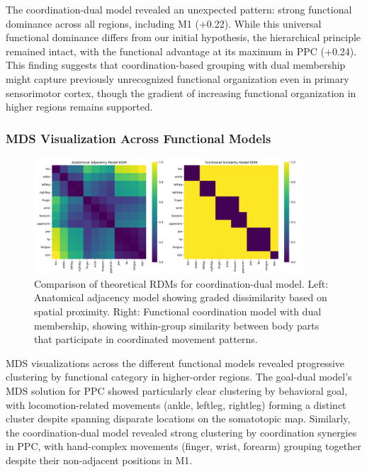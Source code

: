 \documentclass{article}
\begin{document}
The coordination-dual model revealed an unexpected pattern: strong functional dominance across all regions, including M1 (+0.22). While this universal functional dominance differs from our initial hypothesis, the hierarchical principle remained intact, with the functional advantage at its maximum in PPC (+0.24). This finding suggests that coordination-based grouping with dual membership might capture previously unrecognized functional organization even in primary sensorimotor cortex, though the gradient of increasing functional organization in higher regions remains supported.

\subsubsection{MDS Visualization Across Functional Models}

\begin{figure}[!htbp]
\centering
\includegraphics[width=0.9\textwidth]{results/coordination_dual/theoretical_rdms.png}
\caption{Comparison of theoretical RDMs for coordination-dual model. Left: Anatomical adjacency model showing graded dissimilarity based on spatial proximity. Right: Functional coordination model with dual membership, showing within-group similarity between body parts that participate in coordinated movement patterns.}
\label{fig:mds_comparison}
\end{figure}

MDS visualizations across the different functional models revealed progressive clustering by functional category in higher-order regions. The goal-dual model's MDS solution for PPC showed particularly clear clustering by behavioral goal, with locomotion-related movements (ankle, leftleg, rightleg) forming a distinct cluster despite spanning disparate locations on the somatotopic map. Similarly, the coordination-dual model revealed strong clustering by coordination synergies in PPC, with hand-complex movements (finger, wrist, forearm) grouping together despite their non-adjacent positions in M1.
\end{document}
